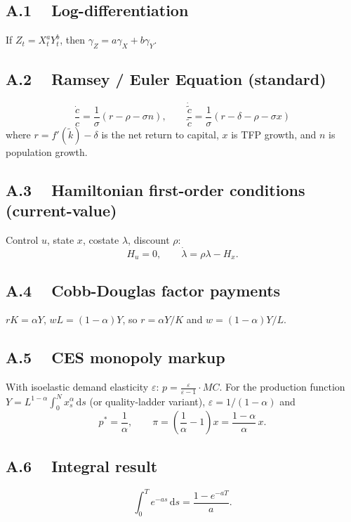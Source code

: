 \documentclass[a4paper,11pt]{article}
\newcommand{\ktilde}{\tilde{k}}
\newcommand{\ctilde}{\tilde{c}}
\newcommand{\dd}{\mathrm{d}}
\begin{document}
\subsection*{A.1 ~ Log-differentiation}
If $Z_t = X_t^a Y_t^b$, then $\gamma_Z = a\gamma_X + b\gamma_Y$.

\subsection*{A.2 ~ Ramsey / Euler Equation (standard)}
\[
    \frac{\dot{c}}{c} = \frac{1}{\sigma}(r - \rho - \sigma n),
    \qquad
    \frac{\dot{\ctilde}}{\ctilde} = \frac{1}{\sigma}(r - \delta - \rho - \sigma x)
\]
where $r = f'(\ktilde) - \delta$ is the net return to capital, $x$ is TFP growth, and
$n$ is population growth.

\subsection*{A.3 ~ Hamiltonian first-order conditions (current-value)}
Control $u$, state $x$, costate $\lambda$, discount $\rho$:
\[
    H_u = 0, \qquad \dot{\lambda} = \rho\lambda - H_x.
\]

\subsection*{A.4 ~ Cobb-Douglas factor payments}
$r K = \alpha Y$, $wL = (1-\alpha)Y$, so $r = \alpha Y/K$ and $w = (1-\alpha)Y/L$.

\subsection*{A.5 ~ CES monopoly markup}
With isoelastic demand elasticity $\varepsilon$:
$p = \frac{\varepsilon}{\varepsilon-1}\cdot MC$.
For the production function $Y = L^{1-\alpha}\!\int_0^N x_s^{\alpha}\,\dd s$
(or quality-ladder variant), $\varepsilon = 1/(1-\alpha)$ and
\[
    p^* = \frac{1}{\alpha},\qquad \pi = \left(\frac{1}{\alpha}-1\right)x = \frac{1-\alpha}{\alpha}\,x.
\]

\subsection*{A.6 ~ Integral result}
\[
    \int_0^T e^{-as}\,\dd s = \frac{1 - e^{-aT}}{a}.
\]
\end{document}
